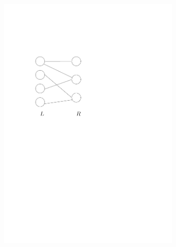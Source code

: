 \documentclass[a4paper]{ctexbook}
\begin{document}
  \begin{figure}
    \centering
    \begin{subfigure}[t]{0.4\linewidth}
      \centering
      \includegraphics[scale=0.5]{figures/bipartite-graph}
      \caption{}
    \end{subfigure}
    \begin{subfigure}[t]{0.4\linewidth}
      \centering

\end{subfigure}
\end{figure}
\end{document}
